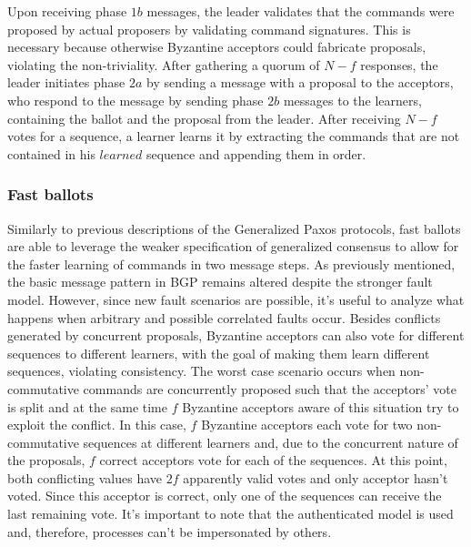 Upon receiving phase $1b$ messages, the leader validates that the commands were proposed by actual proposers by validating command signatures. This is necessary because otherwise Byzantine acceptors could fabricate proposals, violating the non-triviality. After gathering a quorum of $N-f$ responses, the leader initiates phase $2a$ by sending a message with a proposal to the acceptors, who respond to the message by sending phase $2b$ messages to the learners, containing the ballot and the proposal from the leader. After receiving $N-f$ votes for a sequence, a learner learns it by extracting the commands that are not contained in his $learned$ sequence and appending them in order. 

\subsubsection{Fast ballots} 

Similarly to previous descriptions of the Generalized Paxos protocols, fast ballots are able to leverage the weaker specification of generalized consensus to allow for the faster learning of commands in two message steps.
As previously mentioned, the basic message pattern in BGP remains altered despite the stronger fault model. However, since new fault scenarios are possible, it's useful to analyze what happens when arbitrary and possible correlated faults occur. Besides conflicts generated by concurrent proposals, Byzantine acceptors can also vote for different sequences to different learners, with the goal of making them learn different sequences, violating consistency. The worst case scenario occurs when non-commutative commands are concurrently proposed such that the acceptors' vote is split and at the same time $f$ Byzantine acceptors aware of this situation try to exploit the conflict. In this case, $f$ Byzantine acceptors each vote for two non-commutative sequences at different learners and, due to the concurrent nature of the proposals, $f$ correct acceptors vote for each of the sequences. At this point, both conflicting values have $2f$ apparently valid votes and only acceptor hasn't voted. Since this acceptor is correct, only one of the sequences can receive the last remaining vote. It's important to note that the authenticated model is used and, therefore, processes can't be impersonated by others.
 
